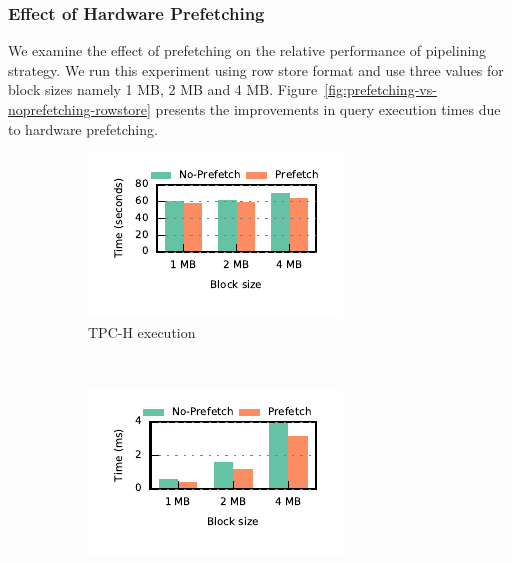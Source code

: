 \subsubsection{Effect of Hardware Prefetching}
We examine the effect of prefetching on the relative performance of pipelining strategy. 
We run this experiment using row store format and use three values for block sizes namely 1 MB, 2 MB and 4 MB.
Figure~\ref{fig:prefetching-vs-noprefetching-rowstore} presents the improvements in query execution times due to hardware prefetching. 

\begin{figure}[t]
	\centering 
	\begin{subfigure}[ht]{0.225\textwidth}
		\includegraphics[width=\textwidth]{pipeline/figures/prefetching-total-execution-time-withlip-rowstore}
		\caption{TPC-H execution}
		\label{fig:prefetching-total}
	\end{subfigure}
	~
	\begin{subfigure}[ht]{0.225\textwidth}
		\includegraphics[width=\textwidth]{pipeline/figures/prefetching-q07-select-withlip-rowstore}

\end{subfigure}
\end{figure}

